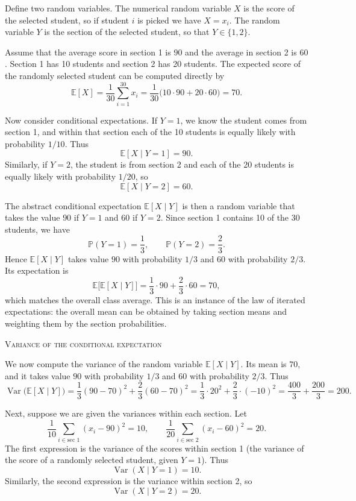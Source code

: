 Define two random variables.  
The numerical random variable \(X\) is the score of the selected student, so if student \(i\) is picked we have \(X = x_i\).  
The random variable \(Y\) is the section of the selected student, so that \(Y \in \{1,2\}\).  

Assume that the average score in section 1 is \(90\) and the average in section 2 is \(60\).  
Section 1 has 10 students and section 2 has 20 students.  
The expected score of the randomly selected student can be computed directly by
\[
\mathbb{E}[X]
=
\frac{1}{30}\sum_{i=1}^{30} x_i
=
\frac{1}{30}\Big(10 \cdot 90 + 20 \cdot 60\Big)
=
70.
\]

Now consider conditional expectations.  
If \(Y = 1\), we know the student comes from section 1, and within that section each of the 10 students is equally likely with probability \(1/10\).  
Thus
\[
\mathbb{E}[X \mid Y = 1] = 90.
\]
Similarly, if \(Y = 2\), the student is from section 2 and each of the 20 students is equally likely with probability \(1/20\), so
\[
\mathbb{E}[X \mid Y = 2] = 60.
\]

The abstract conditional expectation \(\mathbb{E}[X \mid Y]\) is then a random variable that takes the value \(90\) if \(Y = 1\) and \(60\) if \(Y = 2\).  
Since section 1 contains 10 of the 30 students, we have
\[
\mathbb{P}(Y = 1) = \frac{1}{3},
\qquad
\mathbb{P}(Y = 2) = \frac{2}{3}.
\]
Hence \(\mathbb{E}[X \mid Y]\) takes value \(90\) with probability \(1/3\) and \(60\) with probability \(2/3\).  
Its expectation is
\[
\mathbb{E}\big[\mathbb{E}[X \mid Y]\big]
=
\frac{1}{3}\cdot 90 + \frac{2}{3}\cdot 60
=
70,
\]
which matches the overall class average.  
This is an instance of the law of iterated expectations: the overall mean can be obtained by taking section means and weighting them by the section probabilities.

\bigskip
\textsc{Variance of the conditional expectation}

We now compute the variance of the random variable \(\mathbb{E}[X \mid Y]\).  
Its mean is \(70\), and it takes value \(90\) with probability \(1/3\) and \(60\) with probability \(2/3\).  
Thus
\[
\operatorname{Var}\big(\mathbb{E}[X \mid Y]\big)
=
\frac{1}{3}(90 - 70)^{2}
+
\frac{2}{3}(60 - 70)^{2}
=
\frac{1}{3}\cdot 20^{2}
+
\frac{2}{3}\cdot (-10)^{2}
=
\frac{400}{3}
+
\frac{200}{3}
=
200.
\]

Next, suppose we are given the variances within each section.  
Let
\[
\frac{1}{10}\sum_{i \in \text{sec 1}} (x_i - 90)^{2} = 10,
\qquad
\frac{1}{20}\sum_{i \in \text{sec 2}} (x_i - 60)^{2} = 20.
\]
The first expression is the variance of the scores within section 1 (the variance of the score of a randomly selected student, given \(Y = 1\)).  
Thus
\[
\operatorname{Var}(X \mid Y = 1) = 10.
\]
Similarly, the second expression is the variance within section 2, so
\[
\operatorname{Var}(X \mid Y = 2) = 20.
\]

